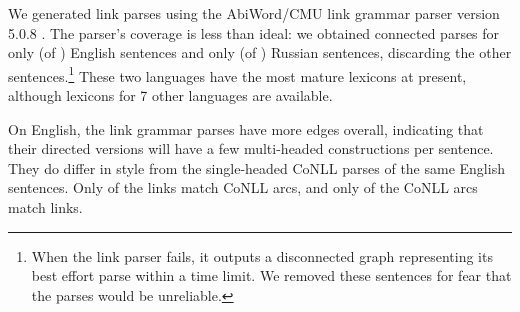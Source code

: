\documentclass[a4paper,11pt]{article}
\begin{document}
We generated link parses using the AbiWord/CMU link grammar parser version 5.0.8 \cite{LINKPARSER-2014}.  The parser's coverage is less than ideal: we obtained connected parses for only (of $\!\!$) English sentences and only (of \mbox{$\!\!$)} Russian sentences, discarding the other sentences.\footnote{When the link parser fails, it outputs a disconnected graph representing its best effort parse within a time limit. We removed these sentences for fear that the parses would be unreliable.
}
These two languages have the most mature lexicons at present, although lexicons for 7 other languages are available.  

On English, the link grammar parses have more edges overall, indicating that their directed versions will have a few multi-headed constructions per sentence.  They
do differ in style from the single-headed CoNLL parses of the same English sentences.  Only of the links match CoNLL arcs, and only of the CoNLL arcs match links.
%   
% 



\end{document}
